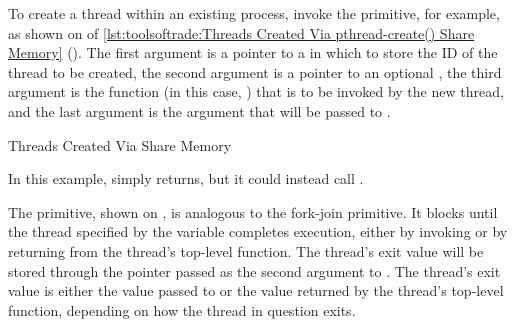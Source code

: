 \begin{fcvref}
To create a thread within an existing process, invoke the
 primitive, for example, as shown on
 of
\cref{lst:toolsoftrade:Threads Created Via pthread-create() Share Memory}
().
The first argument is a pointer to a  in which to store the
ID of the thread to be created, the second  argument is a pointer
to an optional , the third argument is the function
(in this case, )
that is to be invoked by the new thread, and the last  argument
is the argument that will be passed to .
\end{fcvref}

\begin{listing}

\caption{Threads Created Via  Share Memory}
\label{lst:toolsoftrade:Threads Created Via pthread-create() Share Memory}
\end{listing}

In this example,  simply returns, but it could instead
call .

\QuickQuizEnd

\begin{fcvref}
The  primitive, shown on ,
is analogous to
the fork-join  primitive.
It blocks until the thread specified by the  variable completes
execution, either by invoking  or by returning from
the thread's top-level function.
The thread's exit value will be stored through the pointer passed as the
second argument to .
The thread's exit value is either the value passed to 
or the value returned by the thread's top-level function, depending on
how the thread in question exits.
\end{fcvref}

